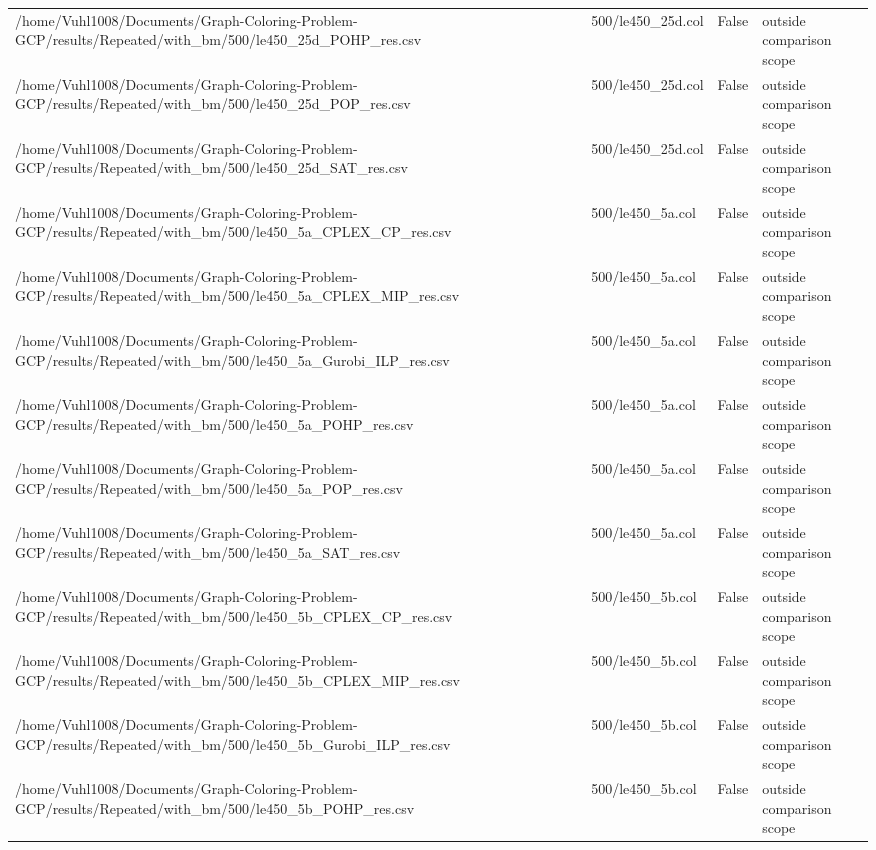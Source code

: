\begin{table}[htbp]
\begin{tabular}{llll}
/home/Vuhl1008/Documents/Graph-Coloring-Problem-GCP/results/Repeated/with\_bm/500/le450\_25d\_POHP\_res.csv & 500/le450\_25d.col & False & outside comparison scope \\
/home/Vuhl1008/Documents/Graph-Coloring-Problem-GCP/results/Repeated/with\_bm/500/le450\_25d\_POP\_res.csv & 500/le450\_25d.col & False & outside comparison scope \\
/home/Vuhl1008/Documents/Graph-Coloring-Problem-GCP/results/Repeated/with\_bm/500/le450\_25d\_SAT\_res.csv & 500/le450\_25d.col & False & outside comparison scope \\
/home/Vuhl1008/Documents/Graph-Coloring-Problem-GCP/results/Repeated/with\_bm/500/le450\_5a\_CPLEX\_CP\_res.csv & 500/le450\_5a.col & False & outside comparison scope \\
/home/Vuhl1008/Documents/Graph-Coloring-Problem-GCP/results/Repeated/with\_bm/500/le450\_5a\_CPLEX\_MIP\_res.csv & 500/le450\_5a.col & False & outside comparison scope \\
/home/Vuhl1008/Documents/Graph-Coloring-Problem-GCP/results/Repeated/with\_bm/500/le450\_5a\_Gurobi\_ILP\_res.csv & 500/le450\_5a.col & False & outside comparison scope \\
/home/Vuhl1008/Documents/Graph-Coloring-Problem-GCP/results/Repeated/with\_bm/500/le450\_5a\_POHP\_res.csv & 500/le450\_5a.col & False & outside comparison scope \\
/home/Vuhl1008/Documents/Graph-Coloring-Problem-GCP/results/Repeated/with\_bm/500/le450\_5a\_POP\_res.csv & 500/le450\_5a.col & False & outside comparison scope \\
/home/Vuhl1008/Documents/Graph-Coloring-Problem-GCP/results/Repeated/with\_bm/500/le450\_5a\_SAT\_res.csv & 500/le450\_5a.col & False & outside comparison scope \\
/home/Vuhl1008/Documents/Graph-Coloring-Problem-GCP/results/Repeated/with\_bm/500/le450\_5b\_CPLEX\_CP\_res.csv & 500/le450\_5b.col & False & outside comparison scope \\
/home/Vuhl1008/Documents/Graph-Coloring-Problem-GCP/results/Repeated/with\_bm/500/le450\_5b\_CPLEX\_MIP\_res.csv & 500/le450\_5b.col & False & outside comparison scope \\
/home/Vuhl1008/Documents/Graph-Coloring-Problem-GCP/results/Repeated/with\_bm/500/le450\_5b\_Gurobi\_ILP\_res.csv & 500/le450\_5b.col & False & outside comparison scope \\
/home/Vuhl1008/Documents/Graph-Coloring-Problem-GCP/results/Repeated/with\_bm/500/le450\_5b\_POHP\_res.csv & 500/le450\_5b.col & False & outside comparison scope \\

\end{tabular}
\end{table}
